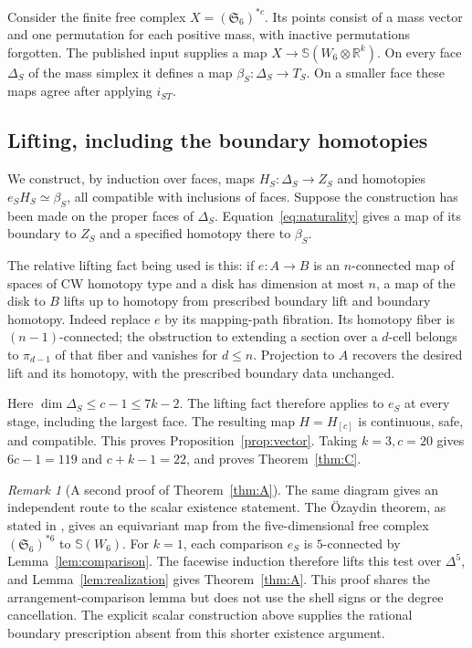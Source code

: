 \documentclass[a4paper,11pt,reqno]{amsart}
\newcommand{\R}{\mathbb R}
\newcommand{\Sym}{\mathfrak S}
\newcommand{\sphere}{\mathbb S}
\theoremstyle{definition}
\theoremstyle{remark}
\newtheorem{remark}[theorem]{Remark}
\numberwithin{equation}{section}
\begin{document}
Consider the finite free complex $X=(\Sym_6)^{*c}$. Its points consist
of a mass vector and one permutation for each positive mass, with
inactive permutations forgotten. The published input supplies a map
$X\to\sphere(W_6\otimes\R^k)$. On every face $\Delta_S$ of the mass
simplex it defines a map $\beta_S:\Delta_S\to T_S$. On a smaller face
these maps agree after applying $i_{ST}$.

\subsection{Lifting, including the boundary homotopies}
We construct, by induction over faces, maps $H_S:\Delta_S\to Z_S$
and homotopies $e_SH_S\simeq\beta_S$, all compatible with inclusions
of faces. Suppose the construction has been made on the proper faces
of $\Delta_S$. Equation~\eqref{eq:naturality} gives a map of its
boundary to $Z_S$ and a specified homotopy there to $\beta_S$.

The relative lifting fact being used is this: if $e:A\to B$ is an
$n$-connected map of spaces of CW homotopy type and a disk has dimension
at most $n$, a map of the disk
to $B$ lifts up to homotopy from prescribed boundary lift and boundary
homotopy. Indeed replace $e$ by its mapping-path fibration. Its
homotopy fiber is $(n-1)$-connected; the obstruction to extending a
section over a $d$-cell belongs to $\pi_{d-1}$ of that fiber and
vanishes for $d\le n$. Projection to $A$ recovers the desired lift
and its homotopy, with the prescribed boundary data unchanged.

Here $\dim\Delta_S\le c-1\le7k-2$. The lifting fact therefore applies
to $e_S$ at every stage, including the largest face. The resulting map
$H=H_{[c]}$ is continuous, safe, and compatible. This proves
Proposition~\ref{prop:vector}. Taking $k=3,c=20$ gives
$6c-1=119$ and $c+k-1=22$, and proves Theorem~\ref{thm:C}.

\begin{remark}[A second proof of Theorem~\ref{thm:A}]
The same diagram gives an independent route to the scalar existence
statement. The \"Ozaydin theorem, as stated in \cite[Theorem 2.2$'$]{AKS},
gives an equivariant map from the five-dimensional free complex
$(\Sym_6)^{*6}$ to $\sphere(W_6)$. For $k=1$, each comparison $e_S$
is $5$-connected by Lemma~\ref{lem:comparison}. The facewise induction
therefore lifts this test over $\Delta^5$, and Lemma~\ref{lem:realization}
gives Theorem~\ref{thm:A}. This proof shares the arrangement-comparison
lemma but does not use the shell signs or the degree cancellation.
The explicit scalar construction above supplies the rational boundary
prescription absent from this shorter existence argument.
\end{remark}
\end{document}
